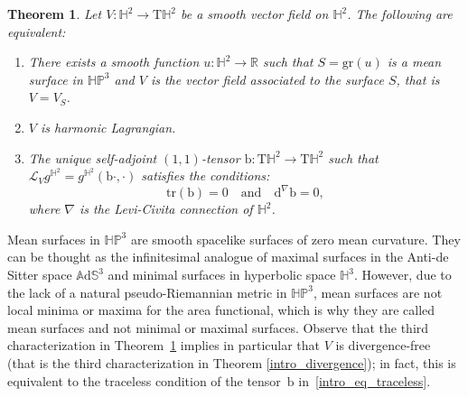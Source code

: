 \documentclass[JEP,XML,SOM,Unicode,NoEqCountersInSection, NoFloatCountersInSection,published]{cedram}
\theoremstyle{plain}
\newtheorem{theorem}[cor]{Theorem}
\theoremstyle{definition}
\newcommand{\bb}{\mathrm{b}}
\newcommand{\ads}{\mathbb{A}\mathrm{d}\mathbb{S}^3}
\newcommand{\HP}{\mathbb{HP}^3}
\begin{document}
\begin{theorem}\label{intro_chara}
Let \(V: \mathbb{H}^2 \to \mathrm{T}\mathbb{H}^2\) be a smooth vector field on \(\mathbb{H}^2\). The following are equivalent:
\begin{enumerate}
\item There exists a smooth function \(u: \mathbb{H}^2 \to \mathbb{R}\) such that \(S=\mathrm{gr}(u)\) is a mean surface in \(\HP\) and \(V\) is the vector field associated to the surface \(S\), that is \(V = V_S\).
\item \(V\) is harmonic Lagrangian.
\item The unique self-adjoint \((1, 1)\)-tensor \(\bb: \mathrm{T}\mathbb{H}^2 \to \mathrm{T}\mathbb{H}^2\) such that \(\mathcal{L}_V g^{\mathbb{H}^2} = g^{\mathbb{H}^2}(\bb \cdot, \cdot)\) satisfies the conditions:
\begin{equation}\label{intro_eq_traceless}
\mathrm{tr}(\bb) = 0 \quad \text{and} \quad \mathrm{d}^{\nabla} \bb = 0,
\end{equation}
where \(\nabla\) is the Levi-Civita connection of \(\mathbb{H}^2\).
\end{enumerate}
\end{theorem}
Mean surfaces in \(\HP\) are smooth spacelike surfaces of zero mean curvature. They can be thought as the infinitesimal analogue of maximal surfaces in the Anti-de Sitter space \(\ads\) and minimal surfaces in hyperbolic space $\mathbb{H}^3$. However, due to the lack of a natural pseudo-Riemannian metric in \(\HP\), mean surfaces are not local minima or maxima for the area functional, which is why they are called mean surfaces and not minimal or maximal surfaces. Observe that the third characterization in Theorem~\ref{intro_chara} implies in particular that \(V\) is divergence-free (that is the third characterization in Theorem \ref{intro_divergence}); in fact, this is equivalent to the traceless condition of the tensor~\(\bb\) in~\eqref{intro_eq_traceless}.
\end{document}

